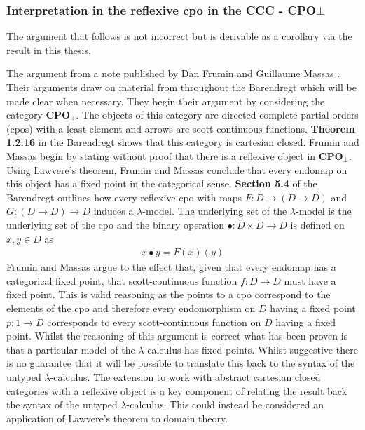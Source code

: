 \subsubsection{Interpretation in the reflexive cpo in the CCC -
\textbf{CPO}$\bot$}
The argument that follows is not incorrect but is derivable as a corollary via
the result in this thesis.

The argument from a note published by Dan Frumin and Guillaume
Massas \cite{frumin2017note}. Their arguments draw on material from throughout the Barendregt
\cite{barendregt1992lambda} which will be made clear when necessary. They begin
their argument by considering the category \textbf{CPO}$_{\bot}$. The objects of
this category are directed complete partial orders (cpos) with a least element
and arrows are scott-continuous functions. \textbf{Theorem 1.2.16} in the
Barendregt shows that this category is cartesian closed. Frumin and Massas begin
by stating without proof that there is a reflexive object in
\textbf{CPO}$_{\bot}$.
Using Lawvere's theorem, Frumin and Massas conclude that every endomap on this
object has a fixed point in the categorical sense. \textbf{Section 5.4} of the
Barendregt outlines how every reflexive cpo with maps $F : D \rightarrow (D
\rightarrow D)$ and $G : (D \rightarrow D) \rightarrow D$ induces a
$\lambda$-model. The underlying set of the $\lambda$-model is the underlying set
of the cpo and the binary operation $\bullet : D \times D \rightarrow D$ is
defined on $x , y \in D$ as \begin{align*} x \bullet y = F(x)(y) \end{align*}
Frumin and Massas argue to the effect that, given that every endomap has a
categorical fixed point, that scott-continuous function $f : D \rightarrow D$
must have a fixed point. This is valid reasoning as the points to a cpo
correspond to the elements of the cpo and therefore every endomorphism on $D$
having a fixed point $p : 1 \rightarrow D$ corresponds to every scott-continuous
function on $D$ having a fixed point. Whilst the reasoning of this argument is
correct what has been proven is that a particular model of the
$\lambda$-calculus has fixed points. Whilst suggestive there is no guarantee
that it will be possible to translate this back to the syntax of the untyped
$\lambda$-calculus. The extension to work with abstract cartesian closed
categories with a reflexive object is a key component of relating the result
back the syntax of the untyped $\lambda$-calculus. This could instead be
considered an application of Lawvere's theorem to domain theory.

